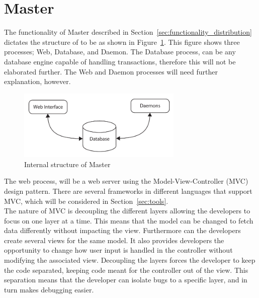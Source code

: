 \section{Master}

The functionality of Master described in Section~\ref{sec:functionality_distribution} dictates the structure of  to be as shown in Figure~\ref{fig:int_struct_m}.
This figure shows three processes; Web, Database, and Daemon.
The Database process,  can be any database engine capable of handling transactions, therefore this will not be elaborated further.
The Web and Daemon processes will need further explanation, however. \\

\begin{figure}[htb]
    \centering
    \includegraphics[width=0.7\textwidth]{gfx/master_internal_structure.pdf}
    \caption{Internal structure of Master}
    \label{fig:int_struct_m}
\end{figure}

The web process,  will be a web server using the Model-View-Controller (MVC) design pattern.
There are several frameworks in different languages that support MVC, which will be considered in Section~\ref{sec:tools}. \\

The nature of MVC is decoupling the different layers allowing the developers to focus on one layer at a time.
This means that the model can be changed to fetch data differently without impacting the view. %
Furthermore can the developers create several views for the same model.
It also provides developers the opportunity to change how user input is handled in the controller without modifying the associated view.
Decoupling the layers forces the developer to keep the code separated, keeping code meant for the controller out of the view.
This separation means that the developer can isolate bugs to a specific layer, and in turn makes debugging easier.

